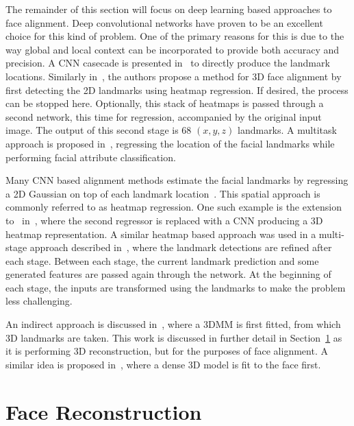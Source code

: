 The remainder of this section will focus on deep learning based
approaches to face alignment. Deep convolutional networks have proven
to be an excellent choice for this kind of problem. One of the primary
reasons for this is due to the way global and local context can be
incorporated to provide both accuracy and precision. A CNN casecade is
presented in~\cite{sun2013deep} to directly produce the landmark
locations. Similarly in~\cite{bulat2016two}, the authors propose a
method for 3D face alignment by first detecting the 2D landmarks using
heatmap regression. If desired, the process can be stopped
here. Optionally, this stack of heatmaps is passed through a second
network, this time for regression, accompanied by the original input
image. The output of this second stage is 68 $(x, y, z)$ landmarks. A
multitask approach is proposed in~\cite{zhang2014facial}, regressing
the location of the facial landmarks while performing facial attribute
classification.

Many CNN based alignment methods estimate the facial landmarks by
regressing a 2D Gaussian on top of each landmark
location~\cite{bulat2016two,bulat2017far,mahpod2018facial,kowalski2017deep,merget2018robust}.
This spatial approach is commonly referred to as heatmap
regression. One such example is the extension to~\cite{bulat2016two}
in~\cite{bulat2017far}, where the second regressor is replaced with a
CNN producing a 3D heatmap representation. A similar heatmap based
approach was used in a multi-stage approach described
in~\cite{kowalski2017deep}, where the landmark detections are refined
after each stage. Between each stage, the current landmark prediction
and some generated features are passed again through the network. At
the beginning of each stage, the inputs are transformed using the
landmarks to make the problem less challenging.

An indirect approach is discussed in~\cite{zhu2016face}, where a 3DMM
is first fitted, from which 3D landmarks are taken. This work is
discussed in further detail in
Section~\ref{chap:literature:sec:face_recon} as it is performing 3D
reconstruction, but for the purposes of face alignment. A similar idea
is proposed in~\cite{jourabloo2016large}, where a dense 3D model is
fit to the face first.

\section{Face Reconstruction}
\label{chap:literature:sec:face_recon}

